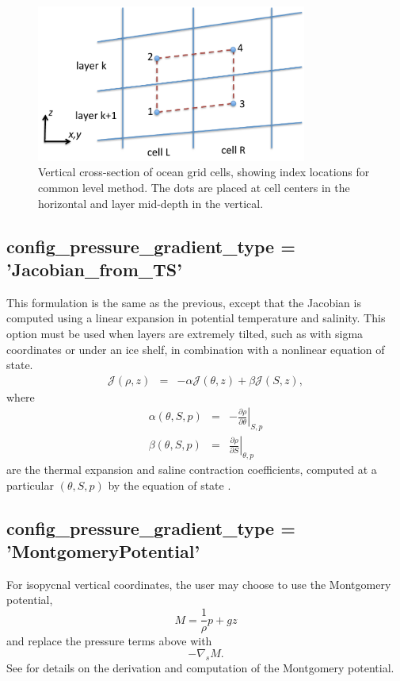 \begin{figure}[htb]
\centering
\includegraphics[width=3.5in]{ocean/figures/common_level.pdf}
\caption{Vertical cross-section of ocean grid cells, showing index locations for common level method.  The dots are placed at cell centers in the horizontal and layer mid-depth in the vertical.}
\label{oceanFigure:\mode_common level}
\end{figure}

\subsection{ config\_pressure\_gradient\_type = 'Jacobian\_from\_TS'}
This formulation is the same as the previous, except that the Jacobian is computed using a linear expansion in potential temperature and salinity.  This option must be used when layers are extremely tilted, such as with sigma coordinates or under an ice shelf, in combination with a nonlinear equation of state.
\begin{eqnarray}
 {\mathcal J}(\rho,z) &=& -\alpha  {\mathcal J}(\theta,z) + \beta  {\mathcal J}(S,z), 
\end{eqnarray}
where
\begin{eqnarray}
\alpha\left( \theta, S, p\right) &=&  -\left. \frac{\partial \rho}{\partial \theta} \right|_{S,p} \\
\beta\left( \theta, S, p\right) &=&  \left. \frac{\partial \rho}{\partial S} \right|_{\theta,p} 
\end{eqnarray}
are the thermal expansion and saline contraction coefficients, computed at a particular  $\left(\theta, S, p\right)$ by the equation of state \citep[eqn 7.16]{Shchepetkin_McWilliams03jgr}.

\subsection{ config\_pressure\_gradient\_type = 'MontgomeryPotential'}
For isopycnal vertical coordinates, the user may choose to use the Montgomery potential,
\begin{equation}
\label{ocean:\mode_Montgomery Potential}
M = \frac{1}{\rho}p+gz
\end{equation}
and replace the pressure terms above with
\begin{equation}
- \nabla_s M.
\end{equation}
See \citet[section 2.1]{Higdon05jcp} for details on the derivation and computation of the Montgomery potential.


